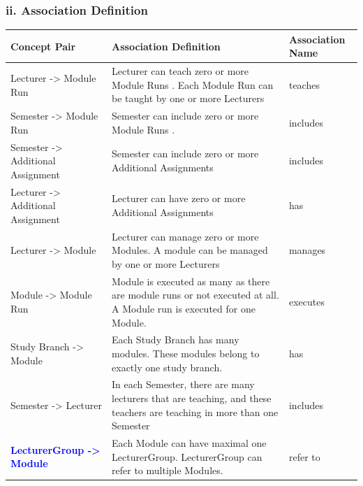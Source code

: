 \documentclass{scrartcl}
\begin{document}
 \subsubsection{ii. Association Definition}
	    \begin{table}[H]
\begin{center}
\begin{tabular}{| p{6.5cm}| p{6.5cm} |p{2.5cm}|}

\hline
\rowcolor{LightCyan}
\textbf{Concept Pair} & \textbf{Association Definition}& \textbf{Association Name} \\
\hline
Lecturer -> Module Run                    &    Lecturer can teach zero or        more Module Runs . Each Module Run can be taught by  one or more Lecturers 	& teaches\\ \hline

Semester -> Module Run                    &      Semester can include zero or more Module Runs  .    	& includes\\ \hline

Semester -> Additional Assignment     &     Semester can include zero or more Additional Assignments      & includes\\ \hline

Lecturer -> Additional Assignment                    &    Lecturer can have zero or more Additional Assignments 	& has\\ \hline

Lecturer -> Module                    &             Lecturer can manage zero or more Modules. A module can be managed by one or more Lecturers	& manages\\ \hline

Module -> Module Run                    &    Module is executed as many
as there are module runs or not executed at all.
A Module run is executed for one Module.& executes \\ \hline

Study Branch -> Module                    &   Each Study Branch has many modules. These modules belong to exactly one study branch.  & has\\ \hline
  Semester -> Lecturer                  &      In each Semester, there are many lecturers that are teaching, and these teachers are teaching in more than one Semester       & includes\\ \hline
 

 
\textbf{\textcolor{blue}{ LecturerGroup -> Module}}  & 
 Each Module can have maximal one LecturerGroup. LecturerGroup can refer to multiple Modules. &  refer to\\ \hline
 

\end{tabular}
\end{center}
\end{table}
\end{document}
